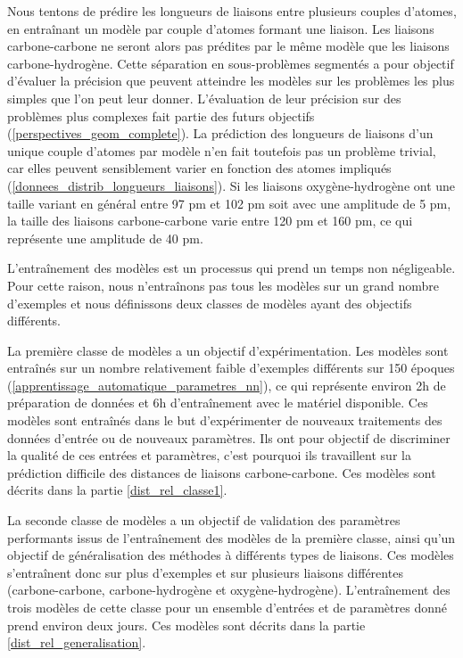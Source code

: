 \label{dist_rel_classes_explication}
\par Nous tentons de prédire les longueurs de liaisons entre plusieurs couples d'atomes, en entraînant un modèle par couple d'atomes formant une liaison. Les liaisons carbone-carbone ne seront alors pas prédites par le même modèle que les liaisons carbone-hydrogène. Cette séparation en sous-problèmes segmentés a pour objectif d'évaluer la précision que peuvent atteindre les modèles sur les problèmes les plus simples que l'on peut leur donner. L'évaluation de leur précision sur des problèmes plus complexes fait partie des futurs objectifs (\ref{perspectives_geom_complete}). La prédiction des longueurs de liaisons d'un unique couple d'atomes par modèle n'en fait toutefois pas un problème trivial, car elles peuvent sensiblement varier en fonction des atomes impliqués (\ref{donnees_distrib_longueurs_liaisons}). Si les liaisons oxygène-hydrogène ont une taille variant en général entre 97 pm et 102 pm soit avec une amplitude de 5 pm, la taille des liaisons carbone-carbone varie entre 120 pm et 160 pm, ce qui représente une amplitude de 40 pm. \\
\par L'entraînement des modèles est un processus qui prend un temps non négligeable. Pour cette raison, nous n'entraînons pas tous les modèles sur un grand nombre d'exemples et nous définissons deux classes de modèles ayant des objectifs différents. \\
\par La première classe de modèles a un objectif d'expérimentation. Les modèles sont entraînés sur un nombre relativement faible d'exemples différents sur 150 époques (\ref{apprentissage_automatique_parametres_nn}), ce qui représente environ 2h de préparation de données et 6h d'entraînement avec le matériel disponible. Ces modèles sont entraînés dans le but d'expérimenter de nouveaux traitements des données d'entrée ou de nouveaux paramètres. Ils ont pour objectif de discriminer la qualité de ces entrées et paramètres, c'est pourquoi ils travaillent sur la prédiction difficile des distances de liaisons carbone-carbone. Ces modèles sont décrits dans la partie \ref{dist_rel_classe1}.	\\
\par La seconde classe de modèles a un objectif de validation des paramètres performants issus de l'entraînement des modèles de la première classe, ainsi qu'un objectif de généralisation des méthodes à différents types de liaisons. Ces modèles s'entraînent donc sur plus d'exemples et sur plusieurs liaisons différentes (carbone-carbone, carbone-hydrogène et oxygène-hydrogène). L'entraînement des trois modèles de cette classe pour un ensemble d'entrées et de paramètres donné prend environ deux jours. Ces modèles sont décrits dans la partie \ref{dist_rel_generalisation}.


